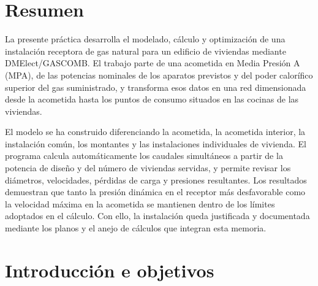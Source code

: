\documentclass[12pt,a4paper]{article}
\begin{document}
\clearpage
\pagestyle{empty}

{
	\hypersetup{linkcolor=black}
	\tableofcontents
	\clearpage

	{
		\let\oldnumberline\numberline
		\renewcommand{\numberline}{\figurename~\oldnumberline}
		\listoffigures
	}
	\clearpage

	{
		\let\oldnumberline\numberline
		\renewcommand{\numberline}{\tablename~\oldnumberline}
		\listoftables
	}

}

\pagestyle{contenido}
\section*{Resumen}
{}

La presente práctica desarrolla el modelado, cálculo y optimización de una instalación receptora de gas natural para un edificio de viviendas mediante DMElect/GASCOMB. El trabajo parte de una acometida en Media Presión A (MPA), de las potencias nominales de los aparatos previstos y del poder calorífico superior del gas suministrado, y transforma esos datos en una red dimensionada desde la acometida hasta los puntos de consumo situados en las cocinas de las viviendas.

El modelo se ha construido diferenciando la acometida, la acometida interior, la instalación común, los montantes y las instalaciones individuales de vivienda. El programa calcula automáticamente los caudales simultáneos a partir de la potencia de diseño y del número de viviendas servidas, y permite revisar los diámetros, velocidades, pérdidas de carga y presiones resultantes. Los resultados demuestran que tanto la presión dinámica en el receptor más desfavorable como la velocidad máxima en la acometida se mantienen dentro de los límites adoptados en el cálculo. Con ello, la instalación queda justificada y documentada mediante los planos y el anejo de cálculos que integran esta memoria.

\section{Introducción e objetivos}
\end{document}
